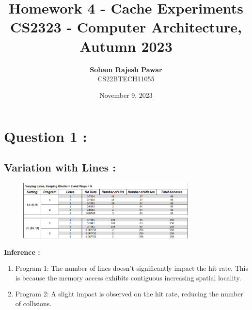 \documentclass{article}
\title{\textbf{\LARGE Homework 4 - Cache Experiments}\\[2ex] \large CS2323 - Computer Architecture, Autumn 2023}
\author{\textbf{\large{Soham Rajesh Pawar}}\\ CS22BTECH11055}
\date{November 9, 2023}
\begin{document}
\maketitle

\section{Question 1 :}
\subsection{Variation with Lines :}
\begin{figure}[H]
  \centering
  \includegraphics[width=0.8\textwidth]{1.1.png}
  \label{fig:example}
\end{figure}
\noindent
\textbf{\large{Inference :}}\\
\begin{enumerate}[label=\alph*)]
  \item Program 1: The number of lines doesn't significantly impact the hit rate. This is because the memory access exhibits contiguous increasing spatial locality.
  \item Program 2: A slight impact is observed on the hit rate, reducing the number of collisions.
\end{enumerate}
\smallskip
\end{document}

